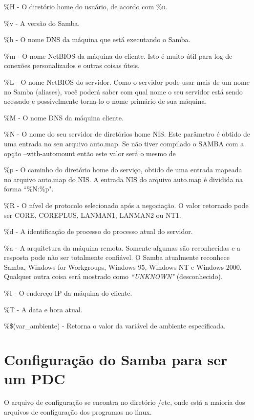 \%H - O diretório home do usuário, de acordo com \%u.

\%v - A versão do Samba.

\%h - O nome DNS da máquina que está executando o Samba.

\%m - O nome NetBIOS da máquina do cliente. Isto é muito útil para log de conexões personalizados e outras coisas úteis.

\%L - O nome NetBIOS do servidor. Como o servidor pode usar mais de um nome no Samba (aliases), você poderá saber com qual nome o seu servidor está sendo acessado e possivelmente torna-lo o nome primário de sua máquina.

\%M - O nome DNS da máquina cliente.

\%N - O nome do seu servidor de diretórios home NIS. Este parâmetro é obtido de uma entrada no seu arquivo auto.map. Se não tiver compilado o SAMBA com a opção --with-automount então este valor será o mesmo de %

\%p - O caminho do diretório home do serviço, obtido de uma entrada mapeada no arquivo auto.map do NIS. A entrada NIS do arquivo auto.map é dividida na forma ``\%N:\%p".

\%R - O nível de protocolo selecionado após a negociação. O valor retornado pode ser CORE, COREPLUS, LANMAN1, LANMAN2 ou NT1.

\%d - A identificação de processo do processo atual do servidor.

\%a - A arquitetura da máquina remota. Somente algumas são reconhecidas e a resposta pode não ser totalmente confiável. O Samba atualmente reconhece Samba, Windows for Workgroups, Windows 95, Windows NT e Windows 2000. Qualquer outra coisa será mostrado como \textit{``UNKNOWN"} (desconhecido).

\%I - O endereço IP da máquina do cliente.

\%T - A data e hora atual.

\%\$(var\_ambiente) - Retorna o valor da variável de ambiente especificada.

\section{Configuração do Samba para ser um PDC}

O arquivo de configuração se encontra no diretório /etc, onde está a maioria dos arquivos de configuração dos programas no linux.

